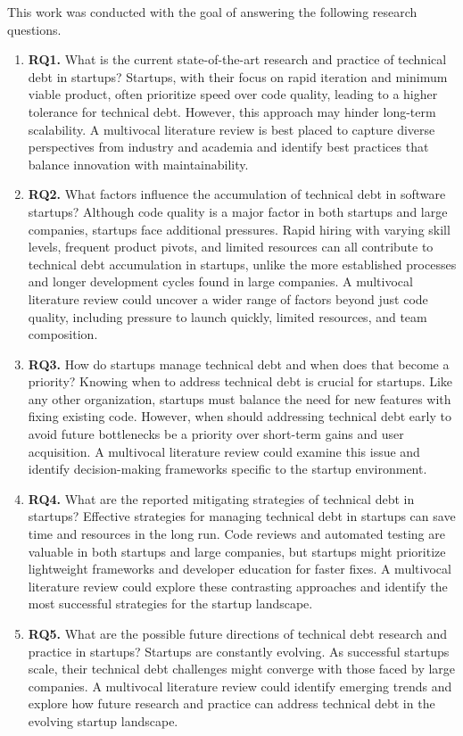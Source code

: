 This work was conducted with the goal of answering the following research questions.
\begin{enumerate}
\item \textbf{RQ1.} What is the current state-of-the-art research and practice of technical debt in startups? Startups, with their focus on rapid iteration and minimum viable product, often prioritize speed over code quality, leading to a higher tolerance for technical debt. However, this approach may hinder long-term scalability. A multivocal literature review is best placed to capture diverse perspectives from industry and academia and identify best practices that balance innovation with maintainability.
\item \textbf{RQ2.} What factors influence the accumulation of technical debt in software startups? Although code quality is a major factor in both startups and large companies, startups face additional pressures. Rapid hiring with varying skill levels, frequent product pivots, and limited resources can all contribute to technical debt accumulation in startups, unlike the more established processes and longer development cycles found in large companies. A multivocal literature review could uncover a wider range of factors beyond just code quality, including pressure to launch quickly, limited resources, and team composition.
\item \textbf{RQ3.} How do startups manage technical debt and when does that become a priority? Knowing when to address technical debt is crucial for startups. Like any other organization, startups must balance the need for new features with fixing existing code. However, when should addressing technical debt early to avoid future bottlenecks be a priority over short-term gains and user acquisition. A multivocal literature review could examine this issue and identify decision-making frameworks specific to the startup environment.
\item \textbf{RQ4.} What are the reported mitigating strategies of technical debt in startups? Effective strategies for managing technical debt in startups can save time and resources in the long run. Code reviews and automated testing are valuable in both startups and large companies, but startups might prioritize lightweight frameworks and developer education for faster fixes. A multivocal literature review could explore these contrasting approaches and identify the most successful strategies for the startup landscape.
\item \textbf{RQ5.} What are the possible future directions of technical debt research and practice in startups? Startups are constantly evolving. As successful startups scale, their technical debt challenges might converge with those faced by large companies. A multivocal literature review could identify emerging trends and explore how future research and practice can address technical debt in the evolving startup landscape.

\end{enumerate}


